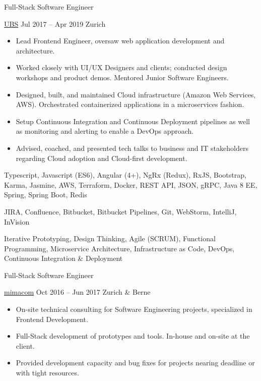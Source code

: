 \documentclass[11pt, a4paper, ragged2e, withhyper]{altacv}
\renewcommand{\cvevent}[4]{%
  {\Large\color{emphasis}#1\par}
  \medskip\normalsize
  \ifstrequal{#2}{}{}{
  	{#2}}
  \ifstrequal{#3}{}{}{{
  	\hspace{0.5em}
  	{#3}}}
  \ifstrequal{#4}{}{}{{
  	\hspace{0.5em}
  	{#4}}}\par
  \medskip\normalsize
}
\begin{document}
\begin{paracol}{2}
	\bigskip\bigskip

	\cvevent{Full-Stack Software Engineer}{\href{https://www.ubs.com/ch/en.html}{UBS}}{Jul 2017 -- Apr 2019}{Zurich}

	\bigskip
	\begin{itemize}[label=\color{bullet}\textbullet]
		\item Lead Frontend Engineer, oversaw web application development and architecture.
		\item Worked closely with UI/UX Designers and clients; conducted design workshops and product demos. Mentored Junior Software Engineers.
		\item Designed, built, and maintained Cloud infrastructure (Amazon Web Services, AWS). Orchestrated containerized applications in a microservices fashion.
		\item Setup Continuous Integration and Continuous Deployment pipelines as well as monitoring and alerting to enable a DevOps approach.
		\item Advised, coached, and presented tech talks to business and IT stakeholders regarding Cloud adoption and Cloud-first development.
	\end{itemize}

	\bigskip
	\begin{description}
	\small
		\item [Technologies:] Typescript, Javascript (ES6), Angular (4+), NgRx (Redux), RxJS, Bootstrap, Karma, Jasmine, AWS, Terraform, Docker, REST API, JSON, gRPC, Java 8 EE, Spring, Spring Boot, Redis\smallskip
		\item [Tools:] JIRA, Confluence, Bitbucket, Bitbucket Pipelines, Git, WebStorm, IntelliJ, InVision\smallskip
		\item [Methodologies:] Iterative Prototyping, Design Thinking, Agile (SCRUM), Functional Programming, Microservice Architecture, Infrastructure as Code, DevOps, Continuous Integration \& Deployment
	\end{description}

	\bigskip\bigskip

	\cvevent{Full-Stack Software Engineer}{\href{https://www.mimacom.com/}{mimacom}}{Oct 2016 -- Jun 2017}{Zurich \& Berne}

	\bigskip
	\begin{itemize}[label=\color{bullet}\textbullet]
		\item On-site technical consulting for Software Engineering projects, specialized in Frontend Development.
		\item Full-Stack development of prototypes and tools. In-house and on-site at the client.
		\item Provided development capacity and bug fixes for projects nearing deadline or with tight resources.
	\end{itemize}


\end{paracol}
\end{document}

